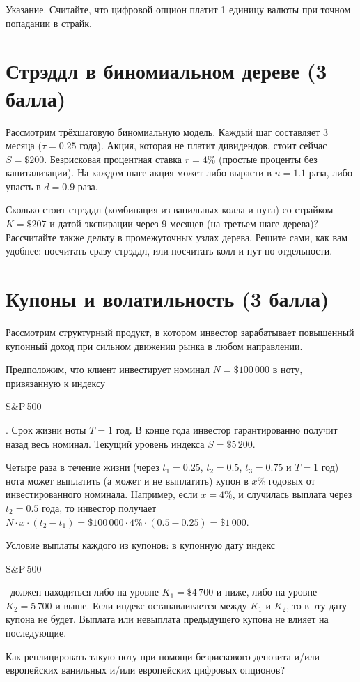 \documentclass[a4paper,14pt]{extarticle}
\newcommand{\en}[1]{\begin{otherlanguage}{english}#1\end{otherlanguage}}
\begin{document}
Указание. Считайте, что цифровой опцион платит 1 единицу валюты при точном попадании в страйк.

\section{Стрэддл в биномиальном дереве (3 балла)}

Рассмотрим трёхшаговую биномиальную модель. Каждый шаг составляет 3 месяца ($\tau=0.25$ года). Акция, которая не платит дивидендов, стоит сейчас $S=\$200$. Безрисковая процентная ставка $r=4\%$ (простые проценты без капитализации). На каждом шаге акция может либо вырасти в $u=1.1$ раза, либо упасть в $d=0.9$ раза.

Сколько стоит стрэддл (комбинация из ванильных колла и пута) со страйком $K=\$207$ и датой экспирации через 9 месяцев (на третьем шаге дерева)? Рассчитайте также дельту в промежуточных узлах дерева. Решите сами, как вам удобнее: посчитать сразу стрэддл, или посчитать колл и пут по отдельности.

\section{Купоны и волатильность (3 балла)}

Рассмотрим структурный продукт, в котором инвестор зарабатывает повышенный купонный доход при сильном движении рынка в любом направлении.

Предположим, что клиент инвестирует номинал $N=\$100\,000$ в ноту, привязанную к индексу \en{S\&P\,500}. Срок жизни ноты $T=1$ год. В конце года инвестор гарантированно получит назад весь номинал. Текущий уровень индекса $S=\$5\,200$.

Четыре раза в течение жизни (через $t_1=0.25$, $t_2=0.5$, $t_3=0.75$ и $T=1$ год) нота может выплатить (а может и не выплатить)  купон в $x\%$ годовых от инвестированного номинала. Например, если $x=4\%$, и случилась выплата через $t_2=0.5$ года, то инвестор получает $N\cdot x\cdot(t_2-t_1) = \$100\,000\cdot4\%\cdot(0.5-0.25)=\$1\,000$.

Условие выплаты каждого из купонов: в купонную дату индекс \en{S\&P\,500}\ должен находиться либо на уровне $K_1=\$4\,700$ и ниже, либо на уровне $K_2=5\,700$ и выше. Если индекс останавливается между $K_1$ и $K_2$, то в эту дату купона не будет. Выплата или невыплата предыдущего купона не влияет на последующие.

Как реплицировать такую ноту при помощи безрискового депозита и/или европейских ванильных и/или европейских цифровых опционов?
\end{document}
